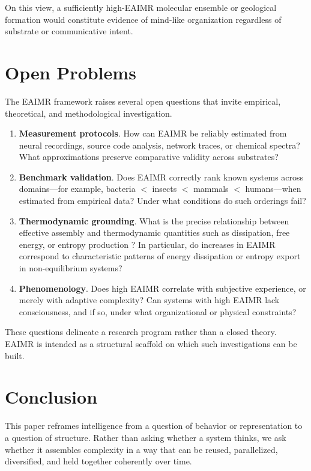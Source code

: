 \documentclass[11pt,letterpaper]{article}
\begin{document}
On this view, a sufficiently high-EAIMR molecular ensemble or geological formation would constitute evidence of mind-like organization regardless of substrate or communicative intent.

\section{Open Problems}

The EAIMR framework raises several open questions that invite empirical, theoretical, and methodological investigation.

\begin{enumerate}
\item \textbf{Measurement protocols}. How can EAIMR be reliably estimated from neural recordings, source code analysis, network traces, or chemical spectra? What approximations preserve comparative validity across substrates?

\item \textbf{Benchmark validation}. Does EAIMR correctly rank known systems across domains—for example, bacteria $<$ insects $<$ mammals $<$ humans—when estimated from empirical data? Under what conditions do such orderings fail?

\item \textbf{Thermodynamic grounding}. What is the precise relationship between effective assembly and thermodynamic quantities such as dissipation, free energy, or entropy production \parencite{landauer1961}? In particular, do increases in EAIMR correspond to characteristic patterns of energy dissipation or entropy export in non-equilibrium systems?

\item \textbf{Phenomenology}. Does high EAIMR correlate with subjective experience, or merely with adaptive complexity? Can systems with high EAIMR lack consciousness, and if so, under what organizational or physical constraints?
\end{enumerate}

These questions delineate a research program rather than a closed theory. EAIMR is intended as a structural scaffold on which such investigations can be built.

\section{Conclusion}

This paper reframes intelligence from a question of behavior or representation to a question of structure. Rather than asking whether a system thinks, we ask whether it assembles complexity in a way that can be reused, parallelized, diversified, and held together coherently over time.
\end{document}
